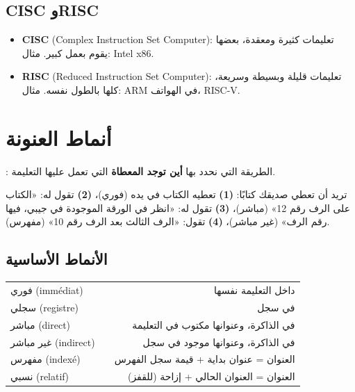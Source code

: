 \subsection{\textenglish{CISC} و\textenglish{RISC}}
\begin{itemize}
    \item \textbf{\textenglish{CISC}} \textenglish{(Complex Instruction Set Computer)}: تعليمات كثيرة
          ومعقدة، بعضها يقوم بعمل كبير. مثال: \textenglish{Intel x86}.
    \item \textbf{\textenglish{RISC}} \textenglish{(Reduced Instruction Set Computer)}: تعليمات قليلة
          وبسيطة وسريعة، كلها بالطول نفسه. مثال: \textenglish{ARM} في الهواتف، \textenglish{RISC-V}.
\end{itemize}

\section{أنماط العنونة}

\begin{tarif}
    : الطريقة التي نحدد بها
    \textbf{أين توجد المعطاة} التي تعمل عليها التعليمة.
\end{tarif}

\begin{tashbih}
    تريد أن تعطي صديقك كتابًا:
    \textbf{(1)} تعطيه الكتاب في يده (فوري)،
    \textbf{(2)} تقول له: «الكتاب على الرف رقم 12» (مباشر)،
    \textbf{(3)} تقول له: «انظر في الورقة الموجودة في جيبي، فيها رقم الرف» (غير مباشر)،
    \textbf{(4)} تقول: «الرف الثالث بعد الرف رقم 10» (مفهرس).
\end{tashbih}

\subsection{الأنماط الأساسية}
\begin{center}
\small
\begin{tabularx}{\linewidth}{|>{\centering\arraybackslash}p{2.4cm}|>{\centering\arraybackslash}p{3.3cm}|R|}
    \hline
     &  &  \\ \hline
    فوري \textenglish{(immédiat)} &  & داخل التعليمة نفسها \\ \hline
    سجلي \textenglish{(registre)} &  & في سجل \\ \hline
    مباشر \textenglish{(direct)} &  & في الذاكرة، وعنوانها مكتوب في التعليمة \\ \hline
    غير مباشر \textenglish{(indirect)} &  & في الذاكرة، وعنوانها موجود في سجل \\ \hline
    مفهرس \textenglish{(indexé)} &  & العنوان = عنوان بداية + قيمة سجل الفهرس \\ \hline
    نسبي \textenglish{(relatif)} &  & العنوان = العنوان الحالي + إزاحة (للقفز) \\ \hline
\end{tabularx}
\end{center}

